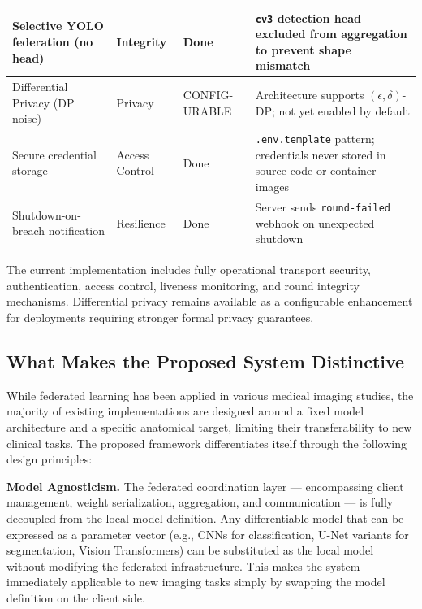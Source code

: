\begin{table}[H]
\begin{tabularx}{\textwidth}{|p{3.8cm}|p{2cm}|p{1.8cm}|X|}
		Selective YOLO federation (no head) &
		Integrity &
		Done &
		\texttt{cv3} detection head excluded from aggregation to prevent shape mismatch \\
		\hline
		
		Differential Privacy (DP noise) &
		Privacy &
		CONFIG-URABLE &
		Architecture supports $(\epsilon,\delta)$-DP; not yet enabled by default \\
		\hline
		
		Secure credential storage &
		Access Control &
		Done &
		\texttt{.env.template} pattern; credentials never stored in source code or container images \\
		\hline
		
		Shutdown-on-breach notification &
		Resilience &
		Done &
		Server sends \texttt{round-failed} webhook on unexpected shutdown \\
		\hline
		
	\end{tabularx}
\end{table}

The current implementation includes fully operational transport security, authentication, access control, liveness monitoring, and round integrity mechanisms. Differential privacy remains available as a configurable enhancement for deployments requiring stronger formal privacy guarantees.
\subsection{What Makes the Proposed System Distinctive}
\label{subsec:fl_novelty}
 
While federated learning has been applied in various medical imaging studies,
the majority of existing implementations are designed around a fixed model
architecture and a specific anatomical target, limiting their transferability
to new clinical tasks. The proposed framework differentiates itself through
the following design principles:
 
\textbf{Model Agnosticism.} The federated coordination layer — encompassing
client management, weight serialization, aggregation, and communication — is
fully decoupled from the local model definition. Any differentiable model
that can be expressed as a parameter vector (e.g., CNNs for classification,
U-Net variants for segmentation, Vision Transformers) can be substituted as
the local model without modifying the federated infrastructure. This makes
the system immediately applicable to new imaging tasks simply by swapping the
model definition on the client side.
  
